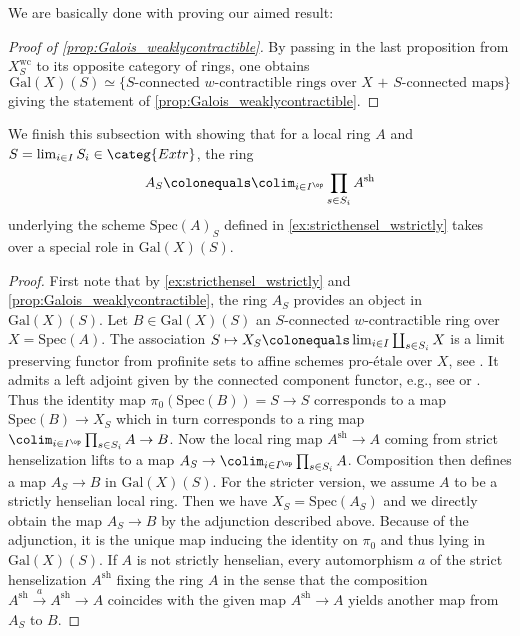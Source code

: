 \documentclass[leqno]{article}
\renewcommand{\Gal}{\mathrm{Gal}}
\newcommand{\Extr}{\categ{Extr}}
\renewcommand{\Spec}{\mathrm{Spec}}
\begin{document}
%
We are basically done with proving our aimed result:
\begin{proof}[Proof of \cref{prop:Galois_weaklycontractible}]
By passing in the last proposition from ${X_{S}^{\mathrm{wc}}}$ to its opposite category of rings, one obtains 
$$\Gal(X)(S)\simeq \{\text{$S$-connected $w$-contractible rings over $X$ + $S$-connected maps}\} $$
giving the statement of \cref{prop:Galois_weaklycontractible}.   
\end{proof}
We finish this subsection with showing that for a local ring $A$ and $S=\lim_{i \in I} S_i\in \Extr$, the ring 
$$A_S\colonequals \colim_{i \in I^{\op}} \prod_{s\in S_i} A^{\mathrm{sh}}$$
underlying the scheme $\Spec(A)_S$ defined in \cref{ex:stricthensel_wstrictly} takes over a special role in $\Gal(X)(S)$.
%
\begin{proof}
First note that by \cref{ex:stricthensel_wstrictly} and \cref{prop:Galois_weaklycontractible}, the ring $A_S$ provides an object in $\Gal(X)(S)$. Let $B\in \Gal(X)(S)$ an $S$-connected $w$-contractible ring over $X=\Spec(A)$. The association $S\mapsto X_S\colonequals\lim_{i \in I} \coprod_{s \in S_i} X $ is a limit preserving functor from profinite sets to affine schemes pro-\'etale over $X$, see \cite[Example 4.1.9]{MR3379634}. It admits a left adjoint given by the connected component functor, e.g., see \cite[Lemma 2.2.8]{MR3379634} or \cite[Lemma A.5.26]{CatrinsThesis}. Thus the identity map $\pi_0(\Spec(B))=S\rightarrow S$ corresponds to a map $\Spec(B) \rightarrow X_S$ which in turn corresponds to a ring map $\colim_{i \in I^{\op}} \prod_{s \in S_i} A\rightarrow B$. Now the local ring map $A^{\mathrm{sh}}\rightarrow A$ coming from strict henselization lifts to a map $A_S\rightarrow \colim_{i \in I^{\op}} \prod_{s \in S_i} A$. Composition then defines a map $A_S \rightarrow B$ in $\Gal(X)(S)$.
%
For the stricter version, we assume $A$ to be a strictly henselian local ring. Then we have $X_S=\Spec(A_S)$ and we directly obtain the map $A_S \rightarrow B$ by the adjunction described above. Because of the adjunction, it is the unique map inducing the identity on $\pi_0$ and thus lying in $\Gal(X)(S)$. If $A$ is not strictly henselian, every automorphism $a$ of the strict henselization $A^{\mathrm{sh}}$ fixing the ring $A$ in the sense that the composition $A^{\mathrm{sh}}\xrightarrow{a} A^{\mathrm{sh}} \rightarrow A$ coincides with the given map $A^{\mathrm{sh}}\rightarrow A$ yields another map from $A_S$ to $B$.
\end{proof}
\end{document}

